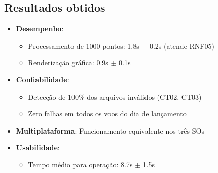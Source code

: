 \subsection{Resultados obtidos}
\begin{itemize}
    \item \textbf{Desempenho}: 
    \begin{itemize}
        \item Processamento de 1000 pontos: 1.8s $\pm$ 0.2s (atende RNF05)
        \item Renderização gráfica: 0.9s $\pm$ 0.1s
    \end{itemize}
    
    \item \textbf{Confiabilidade}: 
    \begin{itemize}
        \item Detecção de 100\% dos arquivos inválidos (CT02, CT03)
        \item Zero falhas em todos os voos do dia de lançamento
    \end{itemize}
    
    \item \textbf{Multiplataforma}: Funcionamento equivalente nos três SOs
    
    \item \textbf{Usabilidade}:
    \begin{itemize}
        \item Tempo médio para operação: 8.7s $\pm$ 1.5s
    \end{itemize}
    
\end{itemize}

